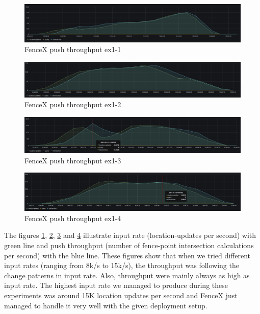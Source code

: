 \documentclass[a4]{report}
\begin{document}
    \begin{figure}[h!]
        \caption{FenceX push throughput ex1-1}
        \label{fig:ex1-1}
        \includegraphics[scale=0.4]{images/evaluation/ex1-benchmarking(15,6).png}
    \end{figure}

    \begin{figure}[h!]
        \caption{FenceX push throughput ex1-2}
        \label{fig:ex1-2}
        \includegraphics[scale=0.4]{images/evaluation/ex1-benchmarking(19,7).png}
    \end{figure}

    \begin{figure}[h!]
        \caption{FenceX push throughput ex1-3}
        \label{fig:ex1-3}
        \includegraphics[scale=0.4]{images/evaluation/ex1-benchmarking(22,9).png}
    \end{figure}

    \begin{figure}[h!]
        \caption{FenceX push throughput ex1-4}
        \label{fig:ex1-4}
        \includegraphics[scale=0.4]{images/evaluation/ex1-benchmarking(23,10).png}
    \end{figure}

    The figures \ref{fig:ex1-1}, \ref{fig:ex1-2}, \ref{fig:ex1-3} and \ref{fig:ex1-4} illustrate input rate
    (location-updates per second) with green line and push throughput (number of fence-point intersection
    calculations per second) with the blue line.
    These figures show that when we tried different input rates (ranging from 8k/s to 15k/s), the throughput was
    following the change patterns in input rate.
    Also, throughput were mainly always as high as input rate.
    The highest input rate we managed to produce during these experiments was around 15K location updates per second
    and FenceX just managed to handle it very well with the given deployment setup.
\end{document}
